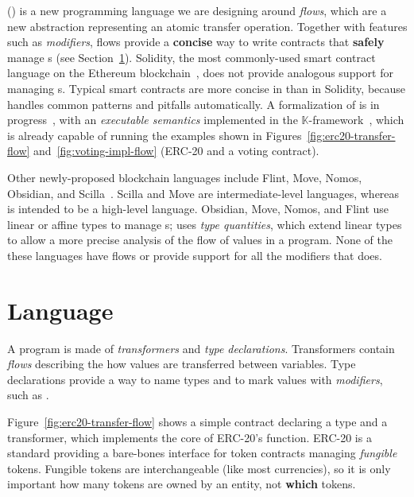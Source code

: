 \documentclass[nonacm, dvipsnames, sigconf]{acmart}
\begin{document}
\langName (\langNamePronounce) is a new programming language we are designing around \emph{flows}, which are a new abstraction representing an atomic transfer operation.
Together with features such as \emph{modifiers}, flows provide a \textbf{concise} way to write contracts that \textbf{safely} manage \assetTxt{}s (see Section~\ref{sec:lang}).
Solidity, the most commonly-used smart contract language on the Ethereum blockchain~\cite{EthereumForDevs}, does not provide analogous support for managing \assetTxt{}s.
Typical smart contracts are more concise in \langName than in Solidity, because \langName handles common patterns and pitfalls automatically.
A formalization of \langName is in progress~\cite{psamatheRepo}, with an \emph{executable semantics} implemented in the $\mathbb{K}$-framework~\cite{rosu-serbanuta-2010-jlap}, which is already capable of running the examples shown in Figures~\ref{fig:erc20-transfer-flow} and~\ref{fig:voting-impl-flow} (ERC-20 and a voting contract).

Other newly-proposed blockchain languages include Flint, Move, Nomos, Obsidian, and Scilla~\cite{schrans2018flint,blackshear2019move,das2019nomos,coblenz2019obsidian,sergey2019scilla}.
Scilla and Move are intermediate-level languages, whereas \langName is intended to be a high-level language.
Obsidian, Move, Nomos, and Flint use linear or affine types to manage \assetTxt{}s; \langName uses \emph{type quantities}, which extend linear types to allow a more precise analysis of the flow of values in a program.
None of the these languages have flows or provide support for all the modifiers that \langName does.

\section{Language}\label{sec:lang}
A \langName program is made of \emph{transformers} and \emph{type declarations}.
Transformers contain \emph{flows} describing the how values are transferred between variables.
Type declarations provide a way to name types and to mark values with \emph{modifiers}, such as .

Figure~\ref{fig:erc20-transfer-flow} shows a simple contract declaring a type and a transformer, which implements the core of ERC-20's  function.
ERC-20 is a standard providing a bare-bones interface for token contracts managing \emph{fungible} tokens.
Fungible tokens are interchangeable (like most currencies), so it is only important how many tokens are owned by an entity, not \textbf{which} tokens.
\end{document}
